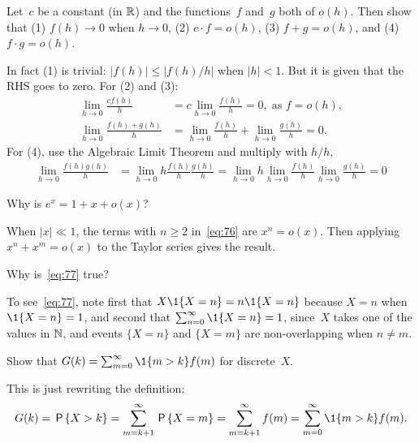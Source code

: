 \documentclass[stochastic-or.tex]{subfiles}
\begin{document}
\begin{exercise}\label{ex:l-104}
 Let~$c$ be a constant (in $\mathbb{R}$) and the functions~$f$ and~$g$ both of $o(h)$. Then show that (1) $f(h) \to 0$ when $h\to 0$, (2) $c\cdot f = o(h)$, (3) $f+g=o(h)$, and (4) $f\cdot g=o(h)$.
\begin{solution}
 In fact (1) is trivial: $|f(h)| \leq |f(h)/h|$ when $|h| < 1$.
 But it is given that the RHS goes to zero.
 For (2) and (3):
\begin{align*}
\lim_{h\to 0} \frac{c f(h)}{h} &= c \lim_{h\to 0} \frac{f(h)}{h} = 0, \; \text{as } f = o(h), \\
\lim_{h\to 0} \frac{f(h) + g(h)} h &= \lim_{h\to 0} \frac{f(h)} h + \lim_{h\to 0} \frac{g(h)} h = 0.
\end{align*}
For (4), use the Algebraic Limit Theorem and multiply with $h/h$,
\begin{align*}
\lim_{h\to 0} \frac{f(h)g(h)}{h} &= \lim_{h\to 0} h \frac{f(h)}{h} \frac{g(h)}{h}
= \lim_{h\to 0} h \lim_{h\to 0} \frac{f(h)}{h} \lim_{h\to 0} \frac{g(h)}{h} = 0
\end{align*}
\end{solution}
\end{exercise}


\begin{exercise}\label{ex:87}
 Why is $e^{x} = 1 +x + o(x)$?
\begin{solution}
 When $|x|\ll 1$, the terms with $n\geq 2$ in~\cref{eq:76} are $x^n = o(x)$. Then applying $x^n + x^m = o(x)$ to the Taylor series gives the result.
\end{solution}
\end{exercise}

\begin{exercise}
 Why is~\cref{eq:77} true?
\begin{solution}
To see~\cref{eq:77}, note first that $X\1{X=n} = n\1{X=n}$ because $X=n$ when $\1{X=n} =1$, and second that $\sum_{n=0}^\infty \1{X=n} =1$, since~$X$ takes one of the values in $\mathbb{N}$, and events $\{X=n\}$ and $\{X=m\}$ are non-overlapping when $n\neq m$.
\end{solution}
\end{exercise}

\begin{exercise}\label{ex:l-105}
Show that $G(k) = \sum_{m=0}^\infty \1{m>k} f(m)$ for discrete~$X$.
\begin{solution}
 This is just rewriting the definition:
\begin{equation*}
G(k) = \P{X>k} = \sum_{m=k+1}^\infty \P{X=m} = \sum_{m=k+1}^\infty f(m)=\sum_{m=0}^\infty \1{m>k}f(m).
\end{equation*}
\end{solution}
\end{exercise}
\end{document}
